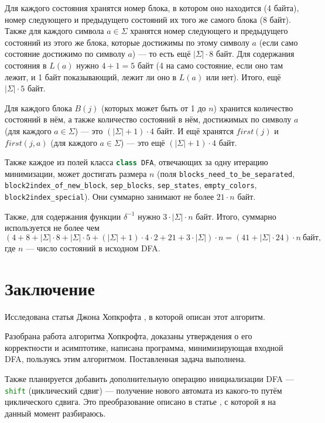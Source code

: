 \documentclass{article}
\begin{document}
Для каждого состояния хранятся номер блока, в котором оно находится (4 байта), номер следующего и предыдущего состояний их того же самого блока (8 байт). Также для каждого символа $a \in \Sigma$ хранятся номер следующего и предыдущего состояний из этого же блока, которые достижимы по этому символу $a$ (если само состояние достижимо по символу $a$) --- то есть ещё $|\Sigma| \cdot 8$ байт. Для содержания состояния в $L(a)$ нужно $4 + 1 = 5$ байт (4 на само состояние, если оно там лежит, и 1 байт показывающий, лежит ли оно в $L(a)$ или нет). Итого, ещё $|\Sigma| \cdot 5$ байт.

Для каждого блока $B(j)$ (которых может быть от 1 до $n$) хранится количество состояний в нём, а также количество состояний в нём, достижимых по символу $a$ (для каждого $a \in \Sigma$) --- это $(|\Sigma| + 1) \cdot 4$ байт. И ещё хранятся $first(j)$ и $first(j, a)$ (для каждого $a \in \Sigma$) --- это ещё $(|\Sigma| + 1) \cdot 4$ байт.

Также каждое из полей класса \lstinline[language=C++]!class DFA!, отвечающих за одну итерацию минимизации, может достигать размера $n$ (поля \lstinline[language=C++]!blocks_need_to_be_separated!, \lstinline[language=C++]!block2index_of_new_block!, \lstinline[language=C++]!sep_blocks!, \lstinline[language=C++]!sep_states!, \lstinline[language=C++]!empty_colors!,\\ \lstinline[language=C++]!block2index_special!). Они суммарно занимают не более $21 \cdot n$ байт. 

Также, для содержания функции $\delta^{-1}$ нужно $3 \cdot |\Sigma| \cdot n$ байт. Итого, суммарно используется не более чем
\[(4 + 8 + |\Sigma| \cdot 8 + |\Sigma| \cdot 5 + (|\Sigma| + 1) \cdot 4 \cdot 2 + 21 + 3 \cdot |\Sigma|) \cdot n = (41 + |\Sigma| \cdot 24) \cdot n \ \text{байт,}\]
где $n$ --- число состояний в исходном DFA.
\section{Заключение}
Исследована статья Джона Хопкрофта \cite{hopcroft1971n}, в которой описан этот алгоритм.

Разобрана работа алгоритма Хопкрофта, доказаны утверждения о его корректности и асимптотике, написана программа, минимизирующая входной DFA, пользуясь этим алгоритмом. Поставленная задача выполнена.

Также планируется добавить дополнительную операцию инициализации DFA --- \lstinline[language=bash]!shift! (циклический сдвиг) --- получение нового автомата из какого-то путём циклического сдвига. Это преобразование описано в статье \cite{shift2008}, с которой я на данный момент разбираюсь.


\end{document}
